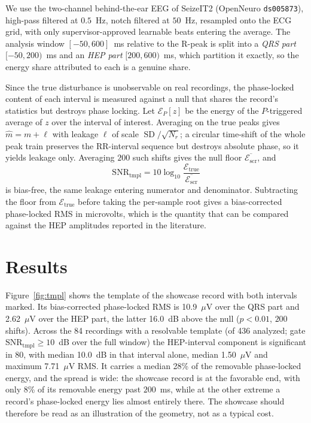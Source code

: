 \documentclass[11pt]{article}
\newcommand{\mhat}{\widehat{m}}
\newcommand{\SD}{\operatorname{SD}}
\begin{document}
We use the two-channel behind-the-ear EEG of SeizeIT2 (OpenNeuro \texttt{ds005873}), high-pass
filtered at $0.5$~Hz, notch filtered at $50$~Hz, resampled onto the ECG grid, with only
supervisor-approved learnable beats entering the average. The analysis window $[-50,600]$~ms
relative to the R-peak is split into a \emph{QRS part} $[-50,200)$~ms and an \emph{HEP part}
$[200,600)$~ms, which partition it exactly, so the energy share attributed to each is a genuine
share.

Since the true disturbance is unobservable on real recordings, the phase-locked content of each
interval is measured against a null that shares the record's statistics but destroys phase locking.
Let $\mathcal{E}_P[z]$ be the energy of the $P$-triggered average of $z$ over the interval of
interest. Averaging on the true peaks gives $\mhat = m + \ell$ with leakage $\ell$ of scale
$\SD/\sqrt{N_r}$; a circular time-shift of the whole peak train preserves the RR-interval sequence
but destroys absolute phase, so it yields leakage only. Averaging $200$ such shifts gives the null
floor $\overline{\mathcal{E}_{\mathrm{scr}}}$, and
\begin{equation}
\mathrm{SNR}_{\mathrm{tmpl}} = 10\log_{10}\frac{\mathcal{E}_{\mathrm{true}}}
{\overline{\mathcal{E}_{\mathrm{scr}}}}
\label{eq:snr}
\end{equation}
is bias-free, the same leakage entering numerator and denominator. Subtracting the floor from
$\mathcal{E}_{\mathrm{true}}$ before taking the per-sample root gives a bias-corrected phase-locked
RMS in microvolts, which is the quantity that can be compared against the HEP amplitudes reported in
the literature.

\section{Results}

Figure~\ref{fig:tmpl} shows the template of the showcase record with both intervals marked. Its
bias-corrected phase-locked RMS is 10.9~$\mu$V over the QRS part and 2.62~$\mu$V over
the HEP part, the latter 16.0~dB above the null ($p<0.01$, $200$ shifts). Across the
84 recordings with a resolvable template (of 436 analyzed; gate
$\mathrm{SNR}_{\mathrm{tmpl}}\ge 10$~dB over the full window) the HEP-interval component is
significant in 80, with median 10.0~dB in that interval alone, median
1.50~$\mu$V and maximum 7.71~$\mu$V RMS. It carries a median 28\% of
the removable phase-locked energy, and the spread is wide: the showcase record is at the favorable
end, with only 8\% of its removable energy past $200$~ms, while at the other extreme a
record's phase-locked energy lies almost entirely there. The showcase should therefore be read as an
illustration of the geometry, not as a typical cost.
\end{document}
